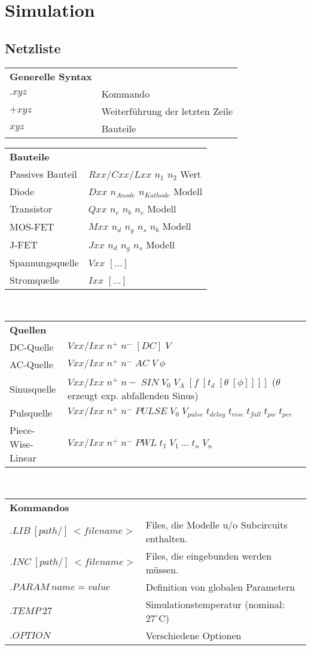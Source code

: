 \section{Simulation}
	\subsection{Netzliste}
			\begin{tabular}{l l}
				{\bf Generelle Syntax}\\
				$.xyz$ & Kommando \\
				$+xyz$ & Weiterführung der letzten Zeile \\
				$xyz$ & Bauteile\\
			\end{tabular}
			\begin{tabular}{l l}
				{\bf Bauteile}\\
				Passives Bauteil & $Rxx/Cxx/Lxx$ $n_1$ $n_2$ Wert \\
				Diode & $Dxx$ $n_{Anode}$ $n_{Kathode}$ Modell \\
				Transistor & $Qxx$ $n_{c}$ $n_{b}$ $n_{e}$ Modell \\
				MOS-FET & $Mxx$ $n_{d}$ $n_{g}$ $n_{s}$ $n_{b}$ Modell \\
				J-FET & $Jxx$ $n_{d}$ $n_{g}$ $n_{s}$ Modell\\
				Spannungsquelle & $Vxx$ $[...]$\\
				Stromquelle & $Ixx$ $[...]$\\
			\end{tabular} \\
			\begin{tabular}{l l }
				{\bf Quellen}\\
				DC-Quelle & $Vxx/Ixx \; n^+ \; n^- \; [DC] \; V$ \\
				AC-Quelle & $Vxx/Ixx \; n^+ \; n^- \; AC \; V \: \phi$ \\
				Sinusquelle & $Vxx/Ixx \; n^+ \; n- \; SIN \; V_0 \; V_A \; [f \; [t_d \; [\theta \; [\phi]]]]$ ($\theta$ erzeugt exp. abfallenden Sinus) \\
				Pulsquelle	& $Vxx/Ixx \; n^+ \; n^- \;  PULSE \; V_0 \; V_{pulse} \; t_{delay} \; t_{rise} \; t_{fall} \; t_{pw} \; t_{per}$\\
				Piece-Wise-Linear & $Vxx/Ixx \; n^+ \; n^- \; PWL \; t_1 \; V_1 \: ... \; t_n \; V_n$\\
			\end{tabular}\\
			\begin{tabular}{l l}
			{\bf Kommandos}\\
				$.LIB \: [path/] \: <filename>$ & Files, die Modelle u/o Subcircuits enthalten. \\
				$.INC \: [path/] \: <filename>$ & Files, die eingebunden werden müssen. \\ 
				$.PARAM \: name=value$ & Definition von globalen Parametern \\
				$.TEMP \: 27$ & Simulationstemperatur (nominal: $27 ^{\circ}\mathrm{C}$) \\
				$.OPTION$ & Verschiedene Optionen\\
			\end{tabular}
